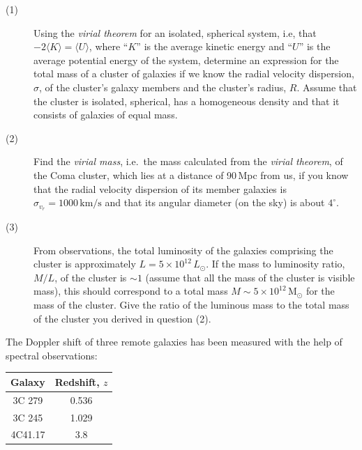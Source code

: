 \begin{description}
\item[(1)] Using the \emph{virial theorem} for an isolated, spherical system,
  i.e, that $-2\langle K\rangle = \langle U\rangle$, where ``$K$'' is the
  average kinetic energy and ``$U$'' is the average potential energy of the
  system, determine an expression for the total mass of a cluster of galaxies
  if we know the radial velocity dispersion, $\sigma$, of the cluster's galaxy
  members and the cluster's radius, $R$. Assume that the cluster is isolated,
  spherical, has a homogeneous density and that it consists of galaxies of
  equal mass.
\item[(2)] Find the \emph{virial mass}, i.e.\ the mass calculated from the
  \emph{virial theorem}, of the Coma cluster, which lies at a distance of
  90\,Mpc from us, if you know that the radial velocity dispersion of its
  member galaxies is $\sigma_{v_r} = 1000\,\mathrm{km/s}$ and that its angular
  diameter (on the sky) is about $4^\circ$.
\item[(3)] From observations, the total luminosity of the galaxies comprising
  the cluster is approximately $L = 5 \times 10^{12}\,L_\odot$. If the mass to
  luminosity ratio, $M/L$, of the cluster is ${\sim}1$ (assume that all the
  mass of the cluster is visible mass), this should correspond to a total mass
  $M \sim 5 \times 10^{12}\,\mathrm{M}_\odot$ for the mass of the cluster.
  Give the ratio of the luminous mass to the total mass of the cluster you
  derived in question (2).
\end{description}

The Doppler shift of three remote galaxies has been measured with the help of
spectral observations:

\begin{center}
\begin{tabular}{|c|c|}
\hline
Galaxy & Redshift, $z$ \\
\hline
3C 279 & 0.536 \\
\hline
3C 245 & 1.029 \\
\hline
4C41.17 & 3.8 \\
\hline
\end{tabular}
\end{center}

